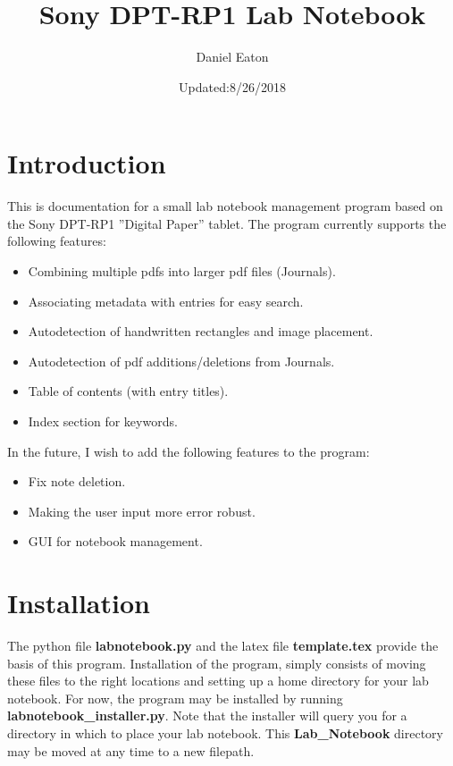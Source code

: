\documentclass{article}
\title{Sony DPT-RP1 Lab Notebook}
\author{Daniel Eaton}
\date{Updated:8/26/2018}
\begin{document}
\maketitle

\section{Introduction}

This is documentation for a small lab notebook management program based on the Sony DPT-RP1 ''Digital Paper'' tablet. The program currently supports the following features:
\begin{itemize}
    \item Combining multiple pdfs into larger pdf files (Journals).
    \item Associating metadata with entries for easy search.
    \item Autodetection of handwritten rectangles and image placement.
    \item Autodetection of pdf additions/deletions from Journals.
    \item Table of contents (with entry titles).
    \item Index section for keywords.
\end{itemize}

\noindent In the future, I wish to add the following features to the program:
\begin{itemize}
    \item Fix note deletion.
    \item Making the user input more error robust.
    \item GUI for notebook management.
\end{itemize}

\section{Installation}
The python file \textbf{labnotebook.py} and the latex file \textbf{template.tex} provide the basis of this program. Installation of the program, simply consists of moving these files to the right locations and setting up a home directory for your lab notebook. For now, the program may be installed by running \textbf{labnotebook\_installer.py}. Note that the installer will query you for a directory in which to place your lab notebook. This \textbf{Lab\_Notebook} directory may be moved at any time to a new filepath.\\
\end{document}
